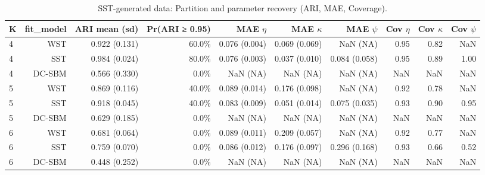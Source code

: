 \begin{table}[!h]
\centering
\caption{SST-generated data: Partition and parameter recovery (ARI, MAE, Coverage).\\\label{tab:sst-main-partition-params}}
\centering
\begin{tabular}[t]{lrrrrrrrrr}
\toprule
K & fit_model & ARI mean (sd) & Pr(ARI ≥ 0.95) & MAE $\eta$ & MAE $\kappa$ & MAE $\psi$ & Cov $\eta$ & Cov $\kappa$ & Cov $\psi$\\
\midrule
4 & WST & 0.922 (0.131) & 60.0\% & 0.076 (0.004) & 0.069 (0.069) & NaN (NA) & 0.95 & 0.82 & NaN\\
4 & SST & 0.984 (0.024) & 80.0\% & 0.076 (0.003) & 0.037 (0.010) & 0.084 (0.058) & 0.95 & 0.89 & 1.00\\
4 & DC-SBM & 0.566 (0.330) & 0.0\% & NaN (NA) & NaN (NA) & NaN (NA) & NaN & NaN & NaN\\
5 & WST & 0.869 (0.116) & 40.0\% & 0.089 (0.014) & 0.176 (0.098) & NaN (NA) & 0.92 & 0.78 & NaN\\
5 & SST & 0.918 (0.045) & 40.0\% & 0.083 (0.009) & 0.051 (0.014) & 0.075 (0.035) & 0.93 & 0.90 & 0.95\\
5 & DC-SBM & 0.629 (0.185) & 0.0\% & NaN (NA) & NaN (NA) & NaN (NA) & NaN & NaN & NaN\\
6 & WST & 0.681 (0.064) & 0.0\% & 0.089 (0.011) & 0.209 (0.057) & NaN (NA) & 0.92 & 0.77 & NaN\\
6 & SST & 0.759 (0.070) & 0.0\% & 0.086 (0.012) & 0.176 (0.097) & 0.296 (0.168) & 0.93 & 0.66 & 0.52\\
6 & DC-SBM & 0.448 (0.252) & 0.0\% & NaN (NA) & NaN (NA) & NaN (NA) & NaN & NaN & NaN\\
\bottomrule
\end{tabular}
\end{table}
